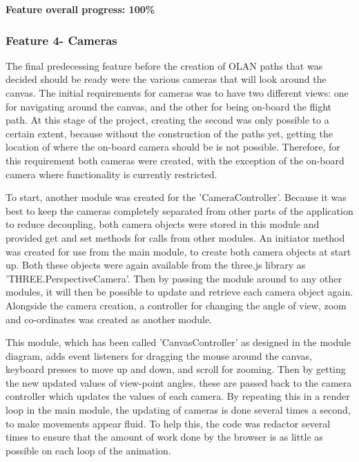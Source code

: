 \textbf{Feature overall progress: 100\%}

\subsubsection{Feature 4- Cameras}
The final predecessing feature before the creation of OLAN paths that was decided should be ready were the various cameras that will look around the canvas. The initial requirements for cameras was to have two different views: one for navigating around the canvas, and the other for being on-board the flight path. At this stage of the project, creating the second was only possible to a certain extent, because without the construction of the paths yet, getting the location of where the on-board camera should be is not possible. Therefore, for this requirement both cameras were created, with the exception of the on-board camera where functionality is currently restricted. 

To start, another module was created for the 'CameraController'. Because it was best to keep the cameras completely separated from other parts of the application to reduce decoupling, both camera objects were stored in this module and provided get and set methods for calls from other modules. An initiator method was created for use from the main module, to create both camera objects at start up. Both these objects were again available from the three.js library as 'THREE.PerspectiveCamera'. Then by passing the module around to any other modules, it will then be possible to update and retrieve each camera object again. Alongside the camera creation, a controller for changing the angle of view, zoom and co-ordinates was created as another module. 

This module, which has been called 'CanvasController' as designed in the module diagram, adds event listeners for dragging the mouse around the canvas, keyboard presses to move up and down, and scroll for zooming. Then by getting the new updated values of view-point angles, these are passed back to the camera controller which updates the values of each camera. By repeating this in a render loop in the main module, the updating of cameras is done several times a second, to make movements appear fluid. To help this, the code was redactor several times to ensure that the amount of work done by the browser is as little as possible on each loop of the animation.

